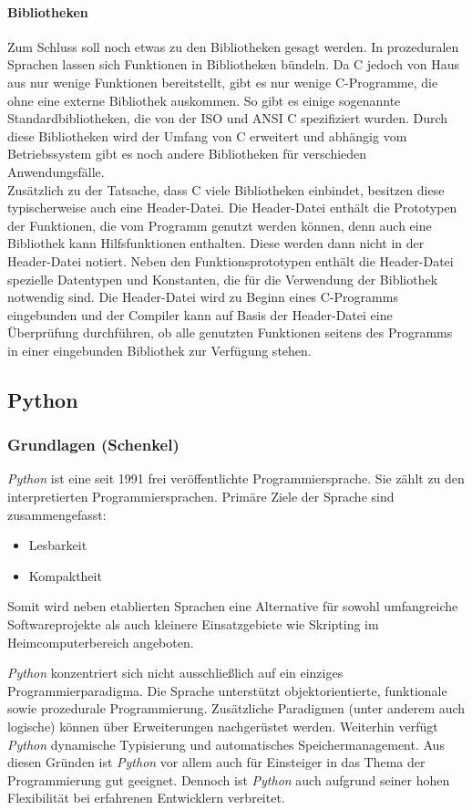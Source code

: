   \paragraph{Bibliotheken}
  Zum Schluss soll noch etwas zu den Bibliotheken gesagt werden. In prozeduralen Sprachen lassen sich
  Funktionen in Bibliotheken bündeln. Da C jedoch von Haus aus nur wenige Funktionen bereitstellt, gibt es
  nur wenige C-Programme, die ohne eine externe Bibliothek auskommen. So gibt es einige sogenannte
  Standardbibliotheken, die von der ISO und ANSI C spezifiziert wurden. Durch diese
  Bibliotheken wird der Umfang von C erweitert und abhängig vom Betriebssystem gibt es noch andere
  Bibliotheken für verschieden Anwendungsfälle. \\
  Zusätzlich zu der Tatsache, dass C viele Bibliotheken einbindet, besitzen diese typischerweise auch
  eine Header-Datei. Die Header-Datei enthält die Prototypen der Funktionen, die vom Programm genutzt
  werden können, denn auch eine Bibliothek kann Hilfsfunktionen enthalten. Diese werden dann nicht in
  der Header-Datei notiert. Neben den Funktionsprototypen enthält die Header-Datei spezielle
  Datentypen und Konstanten, die für die Verwendung der Bibliothek notwendig sind. Die Header-Datei wird
  zu Beginn eines C-Programms eingebunden und der Compiler kann auf Basis der Header-Datei eine Überprüfung
  durchführen, ob alle genutzten Funktionen seitens des Programms in einer eingebunden Bibliothek zur
  Verfügung stehen.

\subsection[Die Sprache Python (Schenkel)]{Python}
\subsubsection{Grundlagen (Schenkel)}
\textit{Python} ist eine seit 1991 frei veröffentlichte Programmiersprache. Sie zählt
zu den interpretierten Programmiersprachen. Primäre Ziele der Sprache sind zusammengefasst:
\begin{itemize}
\item Lesbarkeit
\item Kompaktheit
\end{itemize}
Somit wird neben etablierten Sprachen eine Alternative für sowohl umfangreiche Softwareprojekte
als auch kleinere Einsatzgebiete wie Skripting im Heimcomputerbereich angeboten.

\textit{Python} konzentriert sich nicht ausschließlich auf ein einziges Programmierparadigma.
Die Sprache unterstützt objektorientierte, funktionale sowie prozedurale Programmierung. Zusätzliche
Paradigmen (unter anderem auch logische) können über Erweiterungen nachgerüstet werden.
Weiterhin verfügt \textit{Python} dynamische Typisierung und automatisches Speichermanagement. Aus
diesen Gründen ist \textit{Python} vor allem auch für Einsteiger in das Thema der Programmierung
gut geeignet. Dennoch ist \textit{Python} auch aufgrund seiner hohen Flexibilität
bei erfahrenen Entwicklern verbreitet.

